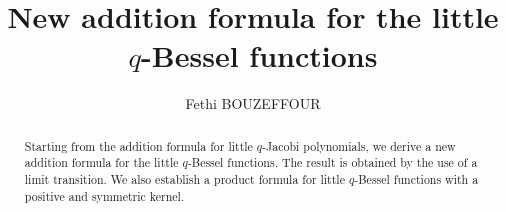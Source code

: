 \documentclass[12pt,a4paper]{amsart}
\numberwithin{equation}{section}
\theoremstyle{plain}
\theoremstyle{definition}
\theoremstyle{remark}
\numberwithin{equation}{section}
\numberwithin{table}{section}
\numberwithin{figure}{section}
\begin{document}
\title[New addition formula for the little $q$-Bessel functions]{New addition formula for the little $q$-Bessel functions}
\author{Fethi BOUZEFFOUR}
\address{Department of mathematics, College of Sciences\\ King Saud University,
 P. O Box 2455 Riyadh 11451, Saudi Arabia.} 

\begin{abstract}
Starting from the addition formula for little $q$-Jacobi polynomials, we
derive a new addition formula for the little $q$-Bessel functions.
The result is obtained by the use of a limit transition. We also
establish a product formula for little $q$-Bessel functions with a positive and
symmetric kernel.
\end{abstract}
\maketitle
\end{document}
